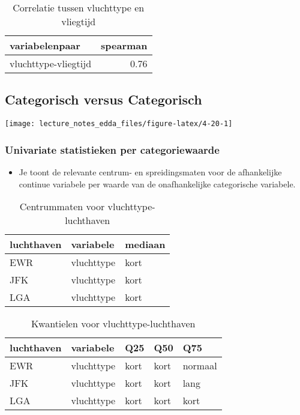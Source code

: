 \documentclass[]{memoir}
\providecommand{\tightlist}{%
  \setlength{\itemsep}{0pt}\setlength{\parskip}{0pt}}
\begin{document}
\begin{table}[t]

\caption{\label{tab:unnamed-chunk-1}Correlatie tussen vluchttype en vliegtijd}
\centering
\fontsize{10}{12}\selectfont
\begin{tabular}{lr}
\toprule
variabelenpaar & spearman\\
\midrule
vluchttype-vliegtijd & 0.76\\
\bottomrule
\end{tabular}
\end{table}

\hypertarget{categorisch-versus-categorisch}{%
\subsection{Categorisch versus Categorisch}\label{categorisch-versus-categorisch}}

\texttt{[image: lecture\_notes\_edda\_files/figure-latex/4-20-1]}

\hypertarget{univariate-statistieken-per-categoriewaarde-1}{%
\subsubsection*{Univariate statistieken per categoriewaarde}\label{univariate-statistieken-per-categoriewaarde-1}}

\begin{itemize}
\tightlist
\item
  Je toont de relevante centrum- en spreidingsmaten voor de afhankelijke continue variabele per waarde van de onafhankelijke categorische variabele.
\end{itemize}

\begin{table}[t]

\caption{\label{tab:unnamed-chunk-2}Centrummaten voor vluchttype-luchthaven}
\centering
\fontsize{10}{12}\selectfont
\begin{tabular}{lll}
\toprule
luchthaven & variabele & mediaan\\
\midrule
EWR & vluchttype & kort\\
JFK & vluchttype & kort\\
LGA & vluchttype & kort\\
\bottomrule
\end{tabular}
\end{table}

\begin{table}[t]

\caption{\label{tab:unnamed-chunk-3}Kwantielen voor vluchttype-luchthaven}
\centering
\fontsize{10}{12}\selectfont
\begin{tabular}{lllll}
\toprule
luchthaven & variabele & Q25 & Q50 & Q75\\
\midrule
EWR & vluchttype & kort & kort & normaal\\
JFK & vluchttype & kort & kort & lang\\
LGA & vluchttype & kort & kort & kort\\
\bottomrule
\end{tabular}
\end{table}
\end{document}
